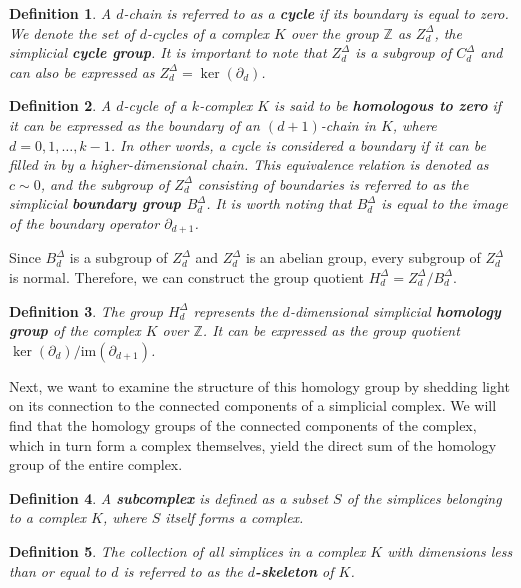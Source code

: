 \documentclass{amsart}
\newtheorem{definition}{Definition}[section]
\begin{document}
\begin{definition}
A $d$-chain is referred to as a \textbf{cycle} if its boundary is equal to zero. We denote the set of $d$-cycles of a complex $K$ over the group $\mathbb{Z}$ as $Z^\Delta_d$, the simplicial \textbf{cycle group}. It is important to note that $Z^\Delta_d$ is a subgroup of $C^\Delta_d$ and can also be expressed as $Z^\Delta_d = \ker(\partial_d)$.
\end{definition}

\begin{definition}
A $d$-cycle of a $k$-complex $K$ is said to be \textbf{homologous to zero} if it can be expressed as the boundary of an $(d+1)$-chain in $K$, where $d=0,1,\ldots,k-1$. In other words, a cycle is considered a boundary if it can be \glqq filled in\grqq{} by a higher-dimensional chain. This equivalence relation is denoted as $c \sim 0$, and the subgroup of $Z^\Delta_d$ consisting of boundaries is referred to as the simplicial \textbf{boundary group $B^\Delta_d$}. It is worth noting that $B^\Delta_d$ is equal to the image of the boundary operator $\partial_{d+1}$.
\end{definition}

Since $B^\Delta_d$ is a subgroup of $Z^\Delta_d$ and $Z^\Delta_d$ is an abelian group, every subgroup of $Z^\Delta_d$ is normal. Therefore, we can construct the group quotient $H^\Delta_d = Z^\Delta_d / B^\Delta_d$.

\begin{definition}
The group $H^\Delta_d$ represents the $d$-dimensional simplicial \textbf{homology group} of the complex $K$ over $\mathbb{Z}$. It can be expressed as the group quotient $\ker(\partial_d) / \text{im}(\partial_{d+1})$.
\end{definition}

Next, we want to examine the structure of this homology group by shedding light on its connection to the connected components of a simplicial complex. We will find that the homology groups of the connected components of the complex, which in turn form a complex themselves, yield the direct sum of the homology group of the entire complex.

\begin{definition}
A \textbf{subcomplex} is defined as a subset $S$ of the simplices belonging to a complex $K$, where $S$ itself forms a complex.
\end{definition}

\begin{definition}
The collection of all simplices in a complex $K$ with dimensions less than or equal to $d$ is referred to as the \textbf{$d$-skeleton} of $K$.
\end{definition}
\end{document}

